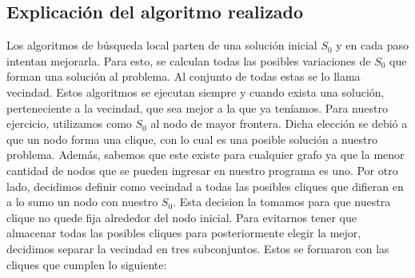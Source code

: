 \subsection{Explicación del algoritmo realizado}
Los algoritmos de búsqueda local parten de una solución inicial $S_{0}$ y en cada paso intentan mejorarla. Para esto, se calculan todas las posibles variaciones de $S_{0}$ que forman una solución al problema. Al conjunto de todas estas se lo llama vecindad. 
Estos algoritmos se ejecutan siempre y cuando exista una solución, perteneciente a la vecindad, que sea mejor a la que ya teníamos. \newline \newline
Para nuestro ejercicio, utilizamos como $S_{0}$ al nodo de mayor frontera. Dicha elección se debió a que un nodo forma una clique, con lo cual es una posible solución a nuestro problema. Además, sabemos que este existe para cualquier grafo ya que la menor cantidad de nodos que se pueden ingresar en nuestro programa es uno. 
\newline Por otro lado, decidimos definir como vecindad a todas las posibles cliques que difieran en a lo sumo un nodo con nuestro $S_{0}$. Esta decision la tomamos para que nuestra clique no quede fija alrededor del nodo inicial. Para evitarnos tener que almacenar todas las posibles cliques para posteriormente elegir la mejor, decidimos separar la vecindad en tres subconjuntos. Estos se formaron con las cliques que cumplen lo siguiente:
